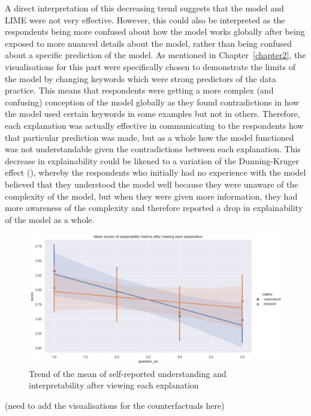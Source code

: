 A direct interpretation of this decreasing trend suggests that the model and LIME were not very effective. However, this could also be interpreted as the respondents being more confused about how the model works globally after being exposed to more nuanced details about the model, rather than being confused about a specific prediction of the model. As mentioned in Chapter~\ref{chapter2}, the visualisations for this part were specifically chosen to demonstrate the limits of the model by changing keywords which were strong predictors of the data practice. This means that respondents were getting a more complex (and confusing) conception of the model globally as they found contradictions in how the model used certain keywords in some examples but not in others. Therefore, each explanation was actually effective in communicating to the respondents how that particular prediction was made, but as a whole how the model functioned was not understandable given the contradictions between each explanation. This decrease in explainability could be likened to a variation of the Dunning-Kruger effect (\cite{dunning_kruger}), whereby the respondents who initially had no experience with the model believed that they understood the model well because they were unaware of the complexity of the model, but when they were given more information, they had more awareness of the complexity and therefore reported a drop in explainability of the model as a whole.

\begin{figure}[!ht]
    \centering
    \includegraphics[width=1\linewidth]{figures/part3.png}
    \caption{Trend of the mean of self-reported understanding and interpretability after viewing each explanation}
    \label{fig:part3_trend}
\end{figure}

(need to add the visualisations for the counterfactuals here)

